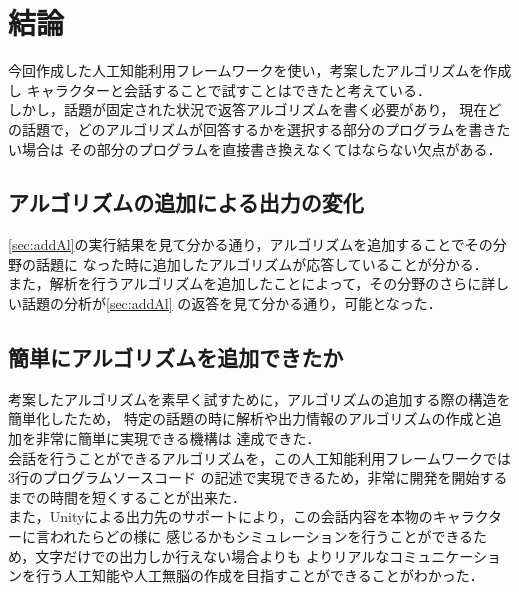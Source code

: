 
\section{結論}
今回作成した人工知能利用フレームワークを使い，考案したアルゴリズムを作成し
キャラクターと会話することで試すことはできたと考えている．
\\
しかし，話題が固定された状況で返答アルゴリズムを書く必要があり，
現在どの話題で，どのアルゴリズムが回答するかを選択する部分のプログラムを書きたい場合は
その部分のプログラムを直接書き換えなくてはならない欠点がある．

\subsection{アルゴリズムの追加による出力の変化}
\ref{sec:addAl}の実行結果を見て分かる通り，アルゴリズムを追加することでその分野の話題に
なった時に追加したアルゴリズムが応答していることが分かる．\\
また，解析を行うアルゴリズムを追加したことによって，その分野のさらに詳しい話題の分析が\ref{sec:addAl}
の返答を見て分かる通り，可能となった．\\

\subsection{簡単にアルゴリズムを追加できたか}
考案したアルゴリズムを素早く試すために，アルゴリズムの追加する際の構造を簡単化したため，
特定の話題の時に解析や出力情報のアルゴリズムの作成と追加を非常に簡単に実現できる機構は
達成できた．
\\
会話を行うことができるアルゴリズムを，この人工知能利用フレームワークでは3行のプログラムソースコード
の記述で実現できるため，非常に開発を開始するまでの時間を短くすることが出来た．
\\
また，Unityによる出力先のサポートにより，この会話内容を本物のキャラクターに言われたらどの様に
感じるかもシミュレーションを行うことができるため，文字だけでの出力しか行えない場合よりも
よりリアルなコミュニケーションを行う人工知能や人工無脳の作成を目指すことができることがわかった．


